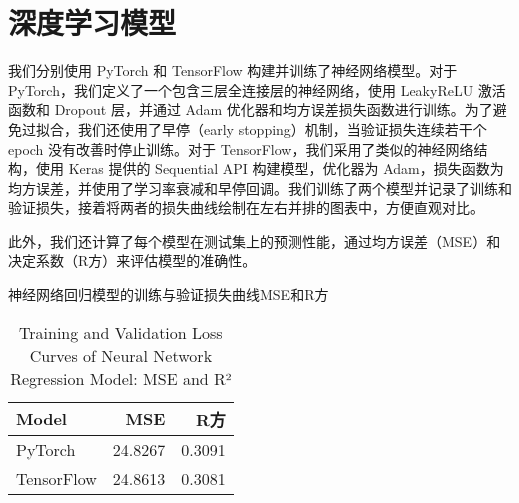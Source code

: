 \documentclass[AutoFakeBold]{LZUThesis-PgD&PhD}
\begin{document}
%		
%		
	
	\section{深度学习模型}
	我们分别使用 PyTorch 和 TensorFlow 构建并训练了神经网络模型。对于 PyTorch，我们定义了一个包含三层全连接层的神经网络，使用 LeakyReLU 激活函数和 Dropout 层，并通过 Adam 优化器和均方误差损失函数进行训练。为了避免过拟合，我们还使用了早停（early stopping）机制，当验证损失连续若干个 epoch 没有改善时停止训练。对于 TensorFlow，我们采用了类似的神经网络结构，使用 Keras 提供的 Sequential API 构建模型，优化器为 Adam，损失函数为均方误差，并使用了学习率衰减和早停回调。我们训练了两个模型并记录了训练和验证损失，接着将两者的损失曲线绘制在左右并排的图表中，方便直观对比。
	
	此外，我们还计算了每个模型在测试集上的预测性能，通过均方误差（MSE）和决定系数（R方）来评估模型的准确性。
	
	\begin{table}[H]
		\centering
		\caption{神经网络回归模型的训练与验证损失曲线MSE和R方}
		\caption*{Training and Validation Loss Curves of Neural Network Regression Model: MSE and R²}
		
		\begin{tabular}{lrr}
			\toprule
			Model & MSE & R方 \\ 
			\midrule
			PyTorch & 24.8267 & 0.3091 \\
			TensorFlow & 24.8613 & 0.3081 \\
			\bottomrule
		\end{tabular}
		
		\label{tab:model_comparison}
	\end{table}
	
\end{document}
